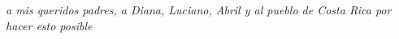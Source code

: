 \vspace*{0.4\textheight}
{\hfill{\Large{\emph{a mis queridos padres, a Diana, Luciano, Abril y al pueblo de Costa Rica por hacer esto posible}}}}
